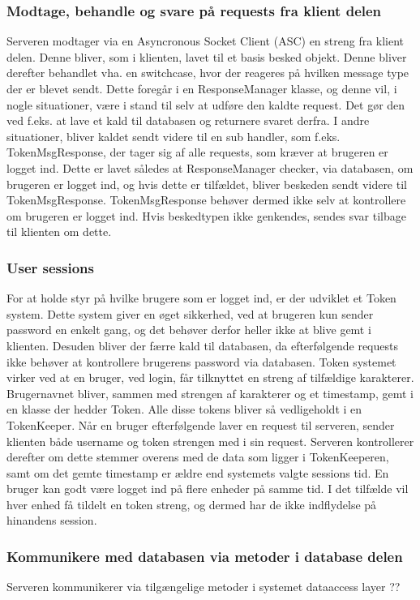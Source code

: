 \subsubsection{Modtage, behandle og svare på requests fra klient delen}
Serveren modtager via en Asyncronous Socket Client (ASC) en streng fra klient delen. Denne bliver, som i klienten, lavet til et basis besked objekt. Denne bliver derefter behandlet vha. en switchcase, hvor der reageres på hvilken message type der er blevet sendt. Dette foregår i en ResponseManager klasse, og denne vil, i nogle situationer, være i stand til selv at udføre den kaldte request. Det gør den ved f.eks. at lave et kald til databasen og returnere svaret derfra. 
I andre situationer, bliver kaldet sendt videre til en sub handler, som f.eks. TokenMsgResponse, der tager sig af alle requests, som kræver at brugeren er logget ind. Dette er lavet således at ResponseManager checker, via databasen, om brugeren er logget ind, og hvis dette er tilfældet, bliver beskeden sendt videre til TokenMsgResponse. TokenMsgResponse behøver dermed ikke selv at kontrollere om brugeren er logget ind.
Hvis beskedtypen ikke genkendes, sendes svar tilbage til klienten om dette.

\subsubsection{User sessions}
For at holde styr på hvilke brugere som er logget ind, er der udviklet et Token system. Dette system giver en øget sikkerhed, ved at brugeren kun sender password en enkelt gang, og det behøver derfor heller ikke at blive gemt i klienten. Desuden bliver der færre kald til databasen, da efterfølgende requests ikke behøver at kontrollere brugerens password via databasen.
Token systemet virker ved at en bruger, ved login, får tilknyttet en streng af tilfældige karakterer. Brugernavnet bliver, sammen med strengen af karakterer og et timestamp, gemt i en klasse der hedder Token. Alle disse tokens bliver så vedligeholdt i en TokenKeeper. Når en bruger efterfølgende laver en request til serveren, sender klienten både username og token strengen med i sin request. Serveren kontrollerer derefter om dette stemmer overens med de data som ligger i TokenKeeperen, samt om det gemte timestamp er ældre end systemets valgte sessions tid.
En bruger kan godt være logget ind på flere enheder på samme tid. I det tilfælde vil hver enhed få tildelt en token streng, og dermed har de ikke indflydelse på hinandens session.

\subsubsection{Kommunikere med databasen via metoder i database delen}
Serveren kommunikerer via tilgængelige metoder i systemet dataaccess layer ??


